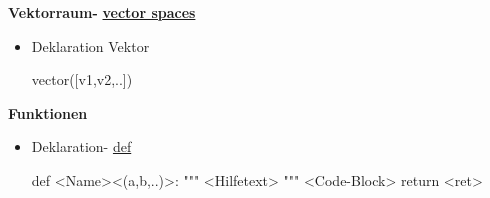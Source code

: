 \documentclass[a4paper,9pt,DIV15,twocolumn]{scrartcl}
\begin{document}
\textbf{Vektorraum- } \href{https://sage.math.uni-goettingen.de/doc/static/reference/sage/categories/vector_spaces.html#vector-spaces}{\textbf{vector spaces}}

\begin{itemize}
 \item Deklaration Vektor
\begin{sagein}
vector([v1,v2,..]) 
\end{sagein}

\end{itemize}

\textbf{Funktionen}

\begin{itemize}
 \item Deklaration- \href{http://docs.python.org/reference/compound_stmts.html#function-definitions}{def}
\begin{sagein}
def <Name><(a,b,..)>:
    """ <Hilfetext> """
    <Code-Block>
    return <ret>
\end{sagein}
\end{itemize}
\end{document}
